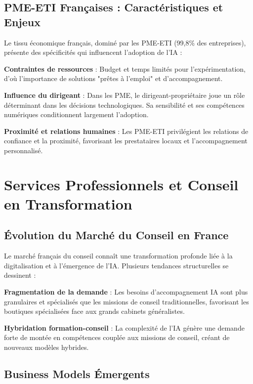 \documentclass[12pt,a4paper]{report}
\begin{document}
\subsection{PME-ETI Françaises : Caractéristiques et Enjeux}

Le tissu économique français, dominé par les PME-ETI (99,8\% des entreprises), présente des spécificités qui influencent l'adoption de l'IA \cite{bpifrance2025ia,france_strategie2025make} :

\textbf{Contraintes de ressources} : Budget et temps limités pour l'expérimentation, d'où l'importance de solutions "prêtes à l'emploi" et d'accompagnement.

\textbf{Influence du dirigeant} : Dans les PME, le dirigeant-propriétaire joue un rôle déterminant dans les décisions technologiques. Sa sensibilité et ses compétences numériques conditionnent largement l'adoption.

\textbf{Proximité et relations humaines} : Les PME-ETI privilégient les relations de confiance et la proximité, favorisant les prestataires locaux et l'accompagnement personnalisé.

\section{Services Professionnels et Conseil en Transformation}

\subsection{Évolution du Marché du Conseil en France}

Le marché français du conseil connaît une transformation profonde liée à la digitalisation et à l'émergence de l'IA. Plusieurs tendances structurelles se dessinent :

\textbf{Fragmentation de la demande} : Les besoins d'accompagnement IA sont plus granulaires et spécialisés que les missions de conseil traditionnelles, favorisant les boutiques spécialisées face aux grands cabinets généralistes.

\textbf{Hybridation formation-conseil} : La complexité de l'IA génère une demande forte de montée en compétences couplée aux missions de conseil, créant de nouveaux modèles hybrides.

\subsection{Business Models Émergents}
\end{document}
